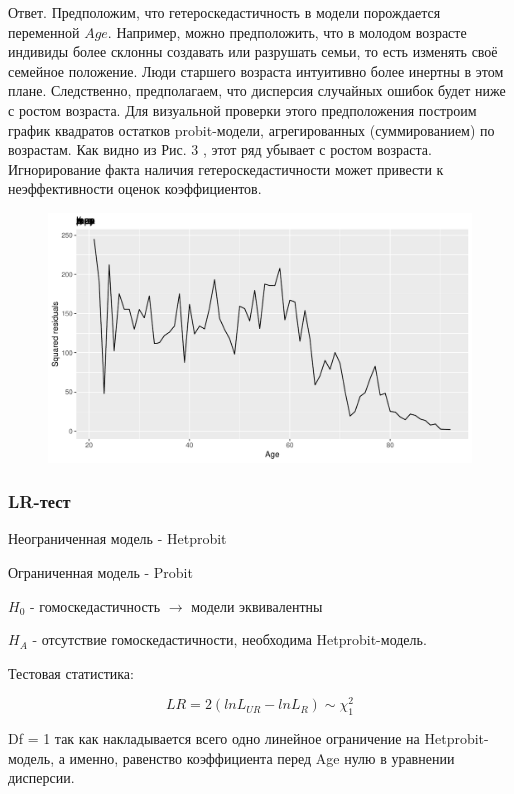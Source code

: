 \documentclass[a4paper,12pt]{article}
\begin{document}
Ответ. Предположим, что гетероскедастичность в модели порождается переменной $ Age $. Например, можно предположить, что в молодом возрасте индивиды более склонны создавать или разрушать семьи, то есть изменять своё семейное положение. Люди старшего возраста интуитивно более инертны в этом плане. Следственно, предполагаем, что дисперсия случайных ошибок будет ниже с ростом возраста. Для визуальной проверки этого предположения построим график квадратов остатков probit-модели, агрегированных (суммированием) по возрастам. Как видно из Рис. 3 , этот ряд убывает с ростом возраста. Игнорирование факта наличия гетероскедастичности может привести к неэффективности оценок коэффициентов.

\begin{figure}[!h]
	\includegraphics[width=\linewidth]{het_age}
	\caption{ \label{his2}}
\end{figure}



\subsubsection{LR-тест}

Неограниченная модель - Hetprobit

Ограниченная модель - Probit 

$ H_0 $ - гомоскедастичность $\to $ модели эквивалентны

$ H_A $ - отсутствие гомоскедастичности, необходима Hetprobit-модель.

Тестовая статистика: 

\[ LR = 2(lnL_{UR} - lnL_{R}) \sim \chi^2_1\]

Df = 1 так как накладывается всего одно линейное ограничение на Hetprobit-модель, а именно, равенство коэффициента перед Age нулю в уравнении дисперсии.
\end{document}

